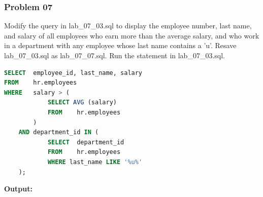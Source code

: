 \subsubsection*{Problem 07}
Modify the query in lab\_07\_03.sql to display the employee number, last name, and salary of all employees who earn more than the average salary, and who work in a department with any employee whose last name contains a 'u'. Resave lab\_07\_03.sql as lab\_07\_07.sql. Run the statement in lab\_07\_03.sql.
\begin{frame}



\begin{lstlisting}[language=SQL]
SELECT 	employee_id, last_name, salary
FROM 	hr.employees
WHERE 	salary > (
         	SELECT AVG (salary)
         	FROM 	hr.employees
   		)
    AND department_id IN (
   			SELECT 	department_id
   			FROM 	hr.employees
   			WHERE last_name LIKE '%u%'
	);
\end{lstlisting}
\textbf{Output: }
\end{frame}


